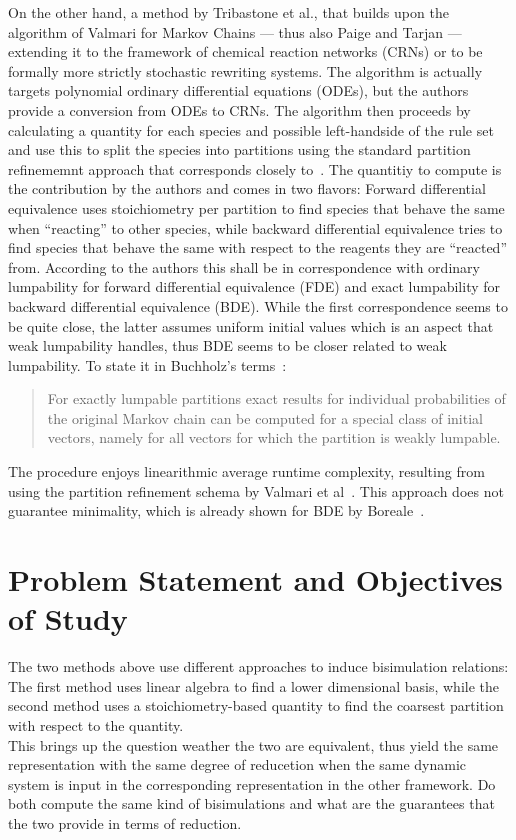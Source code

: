 \documentclass[11pt, rgb]{scrartcl}
\begin{document}
On the other hand, a method by Tribastone et al.\autocite{Cardelli2017MaximalAO}, that builds upon the algorithm of Valmari for Markov Chains\autocite{valmari} --- thus also Paige and Tarjan\autocite{paigetarjan} --- extending it to the framework of chemical reaction networks (CRNs) or to be formally more strictly stochastic rewriting systems. The algorithm is actually targets polynomial ordinary differential equations (ODEs), but the authors provide a conversion from ODEs to CRNs. The algorithm then proceeds by calculating a quantity for each species and possible left-handside of the rule set and use this to split the species into partitions using the standard partition refinememnt approach that corresponds closely to~\autocite{valmari}. The quantitiy to compute is the contribution by the authors and comes in two flavors: Forward differential equivalence uses stoichiometry per partition to find species that behave the same when ``reacting'' to other species, while backward differential equivalence tries to find species that behave the same with respect to the reagents they are ``reacted'' from. According to the authors this shall be in correspondence with ordinary lumpability for forward differential equivalence (FDE) and exact lumpability for backward differential equivalence (BDE). While the first correspondence seems to be quite close, the latter assumes uniform initial values which is an aspect that weak lumpability handles, thus BDE seems to be closer related to weak lumpability. To state it in Buchholz's terms~\autocite{buchholz}:
\begin{quote}
 For exactly lumpable partitions exact results for individual probabilities of the original Markov chain can be computed for a special class of initial vectors, namely for all vectors for which the partition is weakly lumpable.
\end{quote}
The procedure enjoys linearithmic average runtime complexity, resulting from using the partition refinement schema by Valmari et al~\autocite{valmari}. This approach does not guarantee minimality, which is already shown for BDE by Boreale~\autocite{boreale2017algebra}. \\
 

\section{Problem Statement and Objectives of Study}
The two methods above use different approaches to induce bisimulation relations: The first method uses linear algebra to find a lower dimensional basis, while the second method uses a stoichiometry-based quantity to find the coarsest partition with respect to the quantity. \\
This brings up the question weather the two are equivalent, thus yield the same representation with the same degree of reducetion when the same dynamic system is input in the corresponding representation in the other framework. Do both compute the same kind of bisimulations and what are the guarantees that the two provide in terms of reduction. \\
\end{document}
